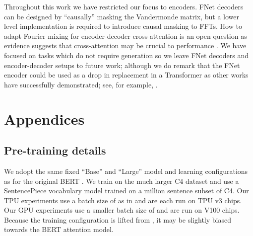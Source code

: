 \documentclass[11pt]{article}
\begin{document}
Throughout this work we have restricted our focus to encoders. FNet decoders can be designed by ``causally'' masking the Vandermonde matrix, but a lower level implementation is required to introduce causal masking to FFTs. How to adapt Fourier mixing for encoder-decoder cross-attention is an open question as evidence suggests that cross-attention may be crucial to performance \citep{you2020hard}. We have focused on tasks which do not require generation so we leave FNet decoders and encoder-decoder setups to future work; although we do remark that the FNet encoder could be used as a drop in replacement in a Transformer as other works have successfully demonstrated; see, for example, \cite{zaheer2020big, guo2021longt5}.
 





\appendix
\clearpage

\section{Appendices}
\label{sec:appendix}


\subsection{Pre-training details}
\label{app:mlm}

We adopt the same fixed ``Base'' and ``Large'' model and learning configurations as for the original BERT \citep{devlin2018bert}. We train on the much larger C4 dataset \citep{raffel2019exploring} and use a  SentencePiece  vocabulary model \citep{kudo2018sentencepiece} trained on a  million sentence subset of C4. Our TPU experiments use a batch size of  as in \citet{devlin2018bert} and are each run on  TPU v3 chips. Our GPU experiments use a smaller batch size of  and are run on  V100 chips. Because the training configuration is lifted from \citet{devlin2018bert}, it may be slightly biased towards the BERT attention model.
\end{document}
